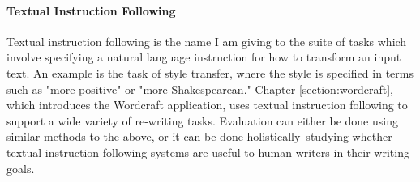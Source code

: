 \paragraph{Textual Instruction Following}
Textual instruction following is the name I am giving to the suite of tasks which involve specifying a natural language instruction for how to transform an input text.
An example is the task of style transfer, where the style is specified in terms such as "more positive" or "more Shakespearean."
Chapter \ref{section:wordcraft}, which introduces the Wordcraft application, uses textual instruction following to support a wide variety of re-writing tasks.
Evaluation can either be done using similar methods to the above, or it can be done holistically--studying whether textual instruction following systems are useful to human writers in their writing goals.

